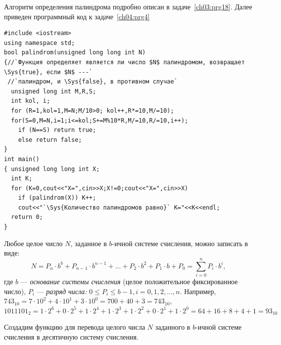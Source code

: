 
Алгоритм определения палиндрома подробно описан в задаче~\ref{ch03:prg18}. 
Далее приведен программный код к задаче~\ref{ch04:prg4}

\begin{lstlisting}
#include <iostream>
using namespace std;
bool palindrom(unsigned long long int N)
{//`Функция определяет является ли число $N$ палиндромом, возвращает \Sys{true}, если $N$ ---`
 //`палиндром, и \Sys{false}, в противном случае`
  unsigned long int M,R,S; 
  int kol, i;
  for (R=1,kol=1,M=N;M/10>0; kol++,R*=10,M/=10);
  for(S=0,M=N,i=1;i<=kol;S+=M%10*R,M/=10,R/=10,i++);
    if (N==S) return true;
    else return false;
}
int main()
{ unsigned long long int X;
  int K;
  for (K=0,cout<<"X=",cin>>X;X!=0;cout<<"X=",cin>>X)
    if (palindrom(X)) K++;
    cout<<"`\Sys{Количество палиндромов равно}` K="<<K<<endl;
  return 0;
}
\end{lstlisting}


Любое целое число $N$, заданное в $b$-ичной системе счисления, можно записать в 
виде: 
\begin{equation*}
N=P_n\cdot b^b+P_{n-1}\cdot b^{n-1}+...+P_2\cdot b^2+P_1\cdot b+P_0=\sum_{i=0}^n{P_i\cdot b^i},
\end{equation*}
где $b$ --- \emph{основание системы счисления} (целое положительное фиксированное число), 
$P_i$  --- \emph{разряд числа:} 
$0\leqslant P_i\leqslant b-1,i=0,1,2,...,n.$
Например,\\
$743_{10}=7\cdot 10^{2}+4\cdot 10^{1}+3\cdot 10^{0}=700+40+3=743_{10}$,\ \  
$1011101_{2}=1\cdot 2^{6}+0\cdot 2^{5}+1\cdot 2^{4}+1\cdot 2^{3}+1\cdot 2^{2}+0\cdot 2^{1}+1\cdot
2^{0}=64+16+8+4+1=93_{10}$

Создадим функцию для перевода целого числа $N$ заданного в
$b$-ичной системе счисления в десятичную систему счисления.

